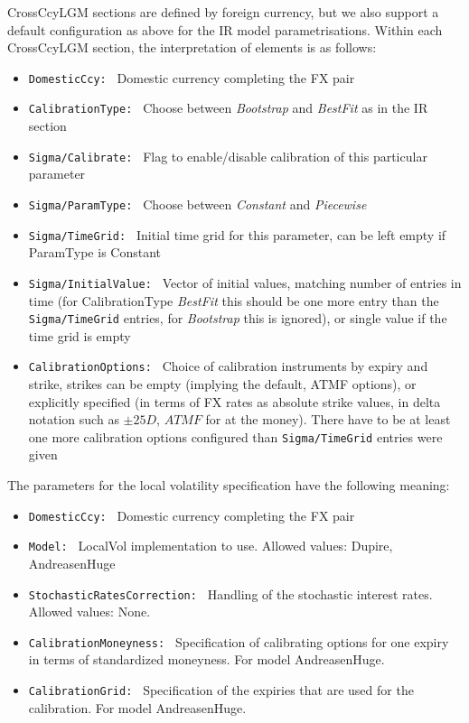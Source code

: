 CrossCcyLGM sections are defined by foreign currency, but we also support a default configuration as above for the IR
model parametrisations.  Within each CrossCcyLGM section, the interpretation of elements is as follows:

\begin{itemize}
\item {\tt DomesticCcy: } Domestic currency completing the FX pair
\item {\tt CalibrationType: } Choose between {\em Bootstrap} and {\em BestFit} as in the IR section
\item {\tt Sigma/Calibrate: } Flag to enable/disable calibration of this particular parameter
\item {\tt Sigma/ParamType: } Choose between {\em Constant} and {\em Piecewise}
\item {\tt Sigma/TimeGrid: } Initial time grid for this parameter, can be left empty if ParamType is Constant
\item {\tt Sigma/InitialValue: } Vector of initial values, matching number of entries in time (for CalibrationType {\em BestFit} this should be one more entry than the {\tt Sigma/TimeGrid} entries, for {\em Bootstrap} this is ignored), or single value if the time grid is empty
\item {\tt CalibrationOptions: } Choice of calibration instruments by expiry and strike, strikes can be empty (implying
the default, ATMF options), or explicitly specified (in terms of FX rates as absolute strike values, in delta notation
such as $\pm 25D$, $ATMF$ for at the money). There have to be at least one more calibration options configured than {\tt Sigma/TimeGrid} entries were given
\end{itemize}

The parameters for the local volatility specification have the following meaning:

\begin{itemize}
\item {\tt DomesticCcy: } Domestic currency completing the FX pair
\item {\tt Model: } LocalVol implementation to use. Allowed values: Dupire, AndreasenHuge
\item {\tt StochasticRatesCorrection: } Handling of the stochastic interest rates. Allowed values: None.
\item {\tt CalibrationMoneyness: } Specification of calibrating options for one expiry in terms of standardized moneyness. For model AndreasenHuge.
\item {\tt CalibrationGrid: } Specification of the expiries that are used for the calibration. For model AndreasenHuge.
\end{itemize}

